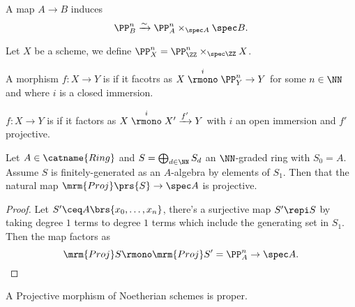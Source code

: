 \documentclass[10pt,a4paper,twoside,openany,hidelinks]{book}
\begin{document}
\begin{remark}
A map $A \to B$ induces
$$\PP_{B}^n \xrightarrow{\sim} \PP_A^n \times_{\spec A} \spec B \text{.}$$
\end{remark}

\begin{definition}
Let $X$ be a scheme, we define $\PP_{X}^{n} = \PP_{\ZZ}^n \times_{\spec \ZZ} X$.
\end{definition}

\begin{definition}
A morphism $f \colon X \to Y$ is  if it facotrs as
$X \stackrel{i}{\rmono} \PP_Y^n \to Y$ for some $n \in \NN$ and where $i$ is a closed immersion.
\end{definition}

\begin{definition}
$f \colon X \to Y$ is  if it factors as $X \stackrel{i}{\rmono} X' \xrightarrow{f'} Y$ with $i$ an open immersion and $f'$ projective.
\end{definition}

\begin{claim}
Let $A \in \catname{Ring}$ and $S = \bigoplus_{d \in \NN} S_d$ an $\NN$-graded ring with $S_0 = A$. Assume $S$ is finitely-generated as an $A$-algebra by elements of $S_1$.
Then that the natural map
$\mrm{Proj}\prs{S} \to \spec A$ is projective.
\end{claim}

\begin{proof}
Let $S' \ceq A\brs{x_0, \ldots, x_n}$, there's a surjective map $S' \repi S$ by taking degree $1$ terms to degree $1$ terms which include the generating set in $S_1$.
Then the map factors as
$$\mrm{Proj} S \rmono \mrm{Proj} S' = \PP_A^n \to \spec A \text{.}$$
\end{proof}

\begin{theorem}
A Projective morphism of Noetherian schemes is proper.
\end{theorem}
\end{document}
